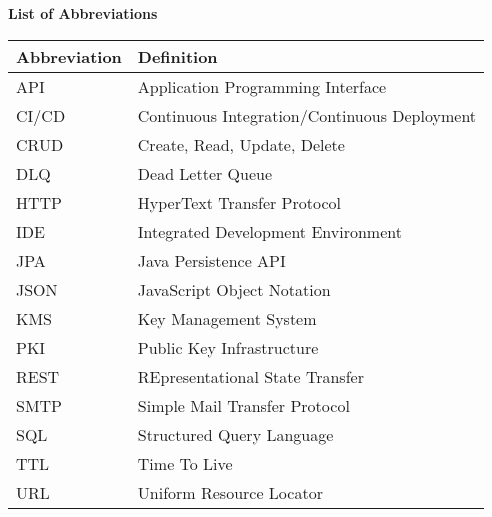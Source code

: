 \vspace*{1cm}
\begin{center}
    \textbf{\huge{List of Abbreviations}}
\end{center}
\vspace{1cm}

\begin{doublespace}
    \begin{center}
        \begin{tabular}{|l|l|}
            \hline
            \textbf{Abbreviation} &  \textbf{Definition} \\

            \hline
            API & Application Programming Interface \\

            \hline
            CI/CD & Continuous Integration/Continuous Deployment \\

            \hline
            CRUD & Create, Read, Update, Delete \\

            \hline
            DLQ & Dead Letter Queue \\

            \hline
            HTTP & HyperText Transfer Protocol \\

            \hline
            IDE & Integrated Development Environment \\

            \hline
            JPA & Java Persistence API \\

            \hline
            JSON & JavaScript Object Notation \\

            \hline
            KMS & Key Management System \\

            \hline
            PKI & Public Key Infrastructure \\

            \hline
            REST & REpresentational State Transfer \\

            \hline
            SMTP & Simple Mail Transfer Protocol \\

            \hline
            SQL & Structured Query Language \\

            \hline
            TTL & Time To Live \\

            \hline
            URL & Uniform Resource Locator \\
            
            \hline
        \end{tabular}
    \end{center}
\end{doublespace}